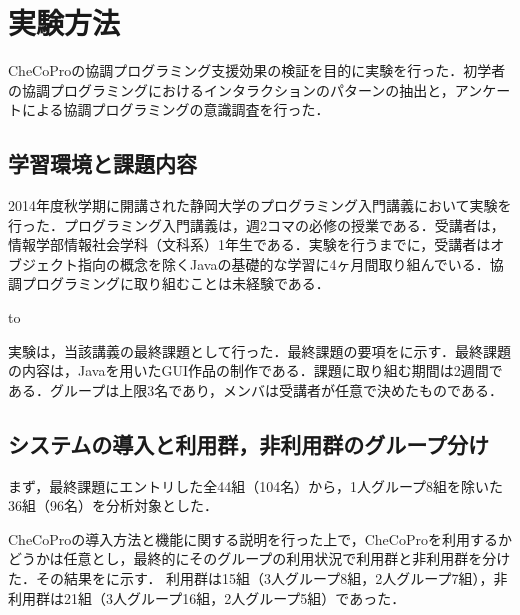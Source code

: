\chapter{実験方法}\label{EM}

CheCoProの協調プログラミング支援効果の検証を目的に実験を行った．初学者の協調プログラミングにおけるインタラクションのパターンの抽出と，アンケートによる協調プログラミングの意識調査を行った．

\section{学習環境と課題内容}

2014年度秋学期に開講された静岡大学のプログラミング入門講義において実験を行った．プログラミング入門講義は，週2コマの必修の授業である．受講者は，情報学部情報社会学科（文科系）1年生である．実験を行うまでに，受講者はオブジェクト指向の概念を除くJavaの基礎的な学習に4ヶ月間取り組んでいる．協調プログラミングに取り組むことは未経験である．


\begin{table}[tb] 
\caption{課題内容} 
\label{tab:final}
\hbox to
\end{table}


実験は，当該講義の最終課題として行った．最終課題の要項をに示す．最終課題の内容は，Javaを用いたGUI作品の制作である．課題に取り組む期間は2週間である．グループは上限3名であり，メンバは受講者が任意で決めたものである．


\section{システムの導入と利用群，非利用群のグループ分け}

まず，最終課題にエントリした全44組（104名）から，1人グループ8組を除いた36組（96名）を分析対象とした．

CheCoProの導入方法と機能に関する説明を行った上で，CheCoProを利用するかどうかは任意とし，最終的にそのグループの利用状況で利用群と非利用群を分けた．その結果をに示す．
利用群は15組（3人グループ8組，2人グループ7組），非利用群は21組（3人グループ16組，2人グループ5組）であった．

